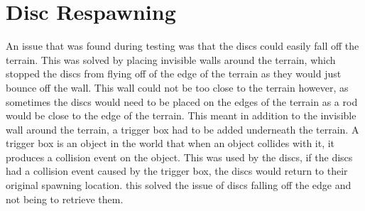 \section{Disc Respawning}
An issue that was found during testing was that the discs could easily fall off the terrain. This was solved by placing invisible walls around the terrain, which stopped the discs from flying off of the edge of the terrain as they would just bounce off the wall. This wall could not be too close to the terrain however, as sometimes the discs would need to be placed on the edges of the terrain as a rod would be close to the edge of the terrain. This meant in addition to the invisible wall around the terrain, a trigger box had to be added underneath the terrain. A trigger box is an object in the world that when an object collides with it, it produces a collision event on the object. This was used by the discs, if the discs had a collision event caused by the trigger box, the discs would return to their original spawning location. this solved the issue of discs falling off the edge and not being to retrieve them.